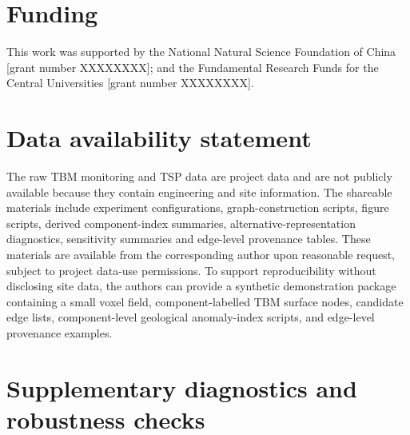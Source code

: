 \documentclass{tGIS2e}
\begin{document}
\section*{Funding}
This work was supported by the National Natural Science Foundation of China [grant number XXXXXXXX]; and the Fundamental Research Funds for the Central Universities [grant number XXXXXXXX].

\section*{Data availability statement}
The raw TBM monitoring and TSP data are project data and are not publicly available because they contain engineering and site information. The shareable materials include experiment configurations, graph-construction scripts, figure scripts, derived component-index summaries, alternative-representation diagnostics, sensitivity summaries and edge-level provenance tables. These materials are available from the corresponding author upon reasonable request, subject to project data-use permissions. To support reproducibility without disclosing site data, the authors can provide a synthetic demonstration package containing a small voxel field, component-labelled TBM surface nodes, candidate edge lists, component-level geological anomaly-index scripts, and edge-level provenance examples.




\clearpage
\appendix
\section{Supplementary diagnostics and robustness checks}
\label{app:descriptor_matrix}

\end{document}
